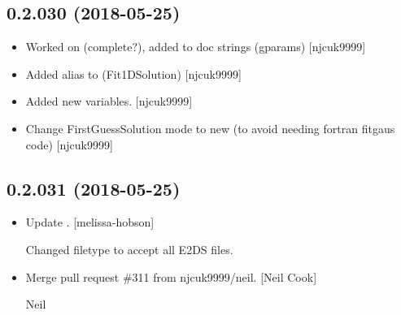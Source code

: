 \documentclass[a4paper,10pt,english]{report}
\begin{document}
\subsection{0.2.030 (2018-05-25)}
\label{\detokenize{misc/changelog:id432}}\begin{itemize}
\item {} 
Worked on  (complete?), added to doc strings (gparams)
{[}njcuk9999{]}

\item {} 
Added alias to  (Fit1DSolution) {[}njcuk9999{]}

\item {} 
Added new  variables. {[}njcuk9999{]}

\item {} 
Change FirstGuessSolution mode to new (to avoid needing fortran
fitgaus code) {[}njcuk9999{]}

\end{itemize}


\subsection{0.2.031 (2018-05-25)}
\label{\detokenize{misc/changelog:id433}}\begin{itemize}
\item {} 
Update . {[}melissa-hobson{]}

Changed filetype to accept all E2DS files.

\item {} 
Merge pull request \#311 from njcuk9999/neil. {[}Neil Cook{]}

Neil

\end{itemize}
\end{document}
